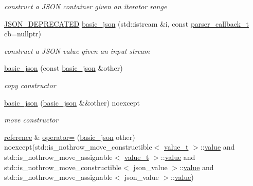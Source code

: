 \begin{DoxyCompactItemize}
\begin{DoxyCompactList}\small\item\em construct a J\+S\+ON container given an iterator range \end{DoxyCompactList}\item 
\mbox{\hyperlink{json_8hpp_a584fd8f49cd7f4ecf5baba15b5b53cdd}{J\+S\+O\+N\+\_\+\+D\+E\+P\+R\+E\+C\+A\+T\+ED}} \mbox{\hyperlink{classnlohmann_1_1basic__json_a757e90574a742ae9cc54c97422fb3043}{basic\+\_\+json}} (std\+::istream \&i, const \mbox{\hyperlink{classnlohmann_1_1basic__json_aecae491e175f8767c550ae3c59e180e3}{parser\+\_\+callback\+\_\+t}} cb=nullptr)
\begin{DoxyCompactList}\small\item\em construct a J\+S\+ON value given an input stream \end{DoxyCompactList}\item 
\mbox{\hyperlink{classnlohmann_1_1basic__json_af5de621bcf646c332343f9c1e011126c}{basic\+\_\+json}} (const \mbox{\hyperlink{classnlohmann_1_1basic__json}{basic\+\_\+json}} \&other)
\begin{DoxyCompactList}\small\item\em copy constructor \end{DoxyCompactList}\item 
\mbox{\hyperlink{classnlohmann_1_1basic__json_a9a06d1efd50a00f4889f831f851ce124}{basic\+\_\+json}} (\mbox{\hyperlink{classnlohmann_1_1basic__json}{basic\+\_\+json}} \&\&other) noexcept
\begin{DoxyCompactList}\small\item\em move constructor \end{DoxyCompactList}\item 
\mbox{\hyperlink{classnlohmann_1_1basic__json_ac6a5eddd156c776ac75ff54cfe54a5bc}{reference}} \& \mbox{\hyperlink{classnlohmann_1_1basic__json_aab256df8c5594ec693035822fa1e2904}{operator=}} (\mbox{\hyperlink{classnlohmann_1_1basic__json}{basic\+\_\+json}} other) noexcept(std\+::is\+\_\+nothrow\+\_\+move\+\_\+constructible$<$ \mbox{\hyperlink{namespacenlohmann_1_1detail_a90aa5ef615aa8305e9ea20d8a947980f}{value\+\_\+t}} $>$\+::\mbox{\hyperlink{classnlohmann_1_1basic__json_af9c51328fbe1da75eca750be3009917a}{value}} and std\+::is\+\_\+nothrow\+\_\+move\+\_\+assignable$<$ \mbox{\hyperlink{namespacenlohmann_1_1detail_a90aa5ef615aa8305e9ea20d8a947980f}{value\+\_\+t}} $>$\+::\mbox{\hyperlink{classnlohmann_1_1basic__json_af9c51328fbe1da75eca750be3009917a}{value}} and std\+::is\+\_\+nothrow\+\_\+move\+\_\+constructible$<$ json\+\_\+value $>$\+::\mbox{\hyperlink{classnlohmann_1_1basic__json_af9c51328fbe1da75eca750be3009917a}{value}} and std\+::is\+\_\+nothrow\+\_\+move\+\_\+assignable$<$ json\+\_\+value $>$\+::\mbox{\hyperlink{classnlohmann_1_1basic__json_af9c51328fbe1da75eca750be3009917a}{value}})

\end{DoxyCompactItemize}
